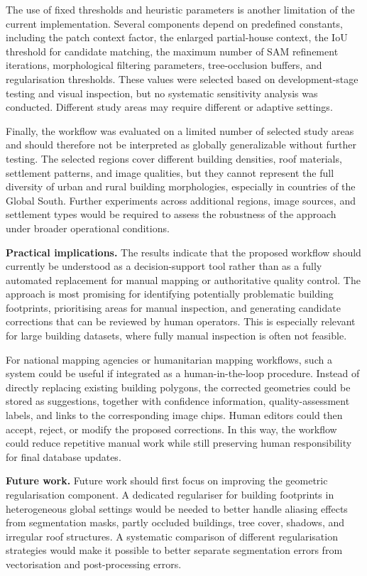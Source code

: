 The use of fixed thresholds and heuristic parameters is another limitation of the current implementation. Several components depend on predefined constants, including the patch context factor, the enlarged partial-house context, the IoU threshold for candidate matching, the maximum number of SAM refinement iterations, morphological filtering parameters, tree-occlusion buffers, and regularisation thresholds. These values were selected based on development-stage testing and visual inspection, but no systematic sensitivity analysis was conducted. Different study areas may require different or adaptive settings.

Finally, the workflow was evaluated on a limited number of selected study areas and should therefore not be interpreted as globally generalizable without further testing. The selected regions cover different building densities, roof materials, settlement patterns, and image qualities, but they cannot represent the full diversity of urban and rural building morphologies, especially in countries of the Global South. Further experiments across additional regions, image sources, and settlement types would be required to assess the robustness of the approach under broader operational conditions.

\textbf{Practical implications.}
The results indicate that the proposed workflow should currently be understood as a decision-support tool rather than as a fully automated replacement for manual mapping or authoritative quality control. The approach is most promising for identifying potentially problematic building footprints, prioritising areas for manual inspection, and generating candidate corrections that can be reviewed by human operators. This is especially relevant for large building datasets, where fully manual inspection is often not feasible.

For national mapping agencies or humanitarian mapping workflows, such a system could be useful if integrated as a human-in-the-loop procedure. Instead of directly replacing existing building polygons, the corrected geometries could be stored as suggestions, together with confidence information, quality-assessment labels, and links to the corresponding image chips. Human editors could then accept, reject, or modify the proposed corrections. In this way, the workflow could reduce repetitive manual work while still preserving human responsibility for final database updates.

\textbf{Future work.}
Future work should first focus on improving the geometric regularisation component. A dedicated regulariser for building footprints in heterogeneous global settings would be needed to better handle aliasing effects from segmentation masks, partly occluded buildings, tree cover, shadows, and irregular roof structures. A systematic comparison of different regularisation strategies would make it possible to better separate segmentation errors from vectorisation and post-processing errors.

